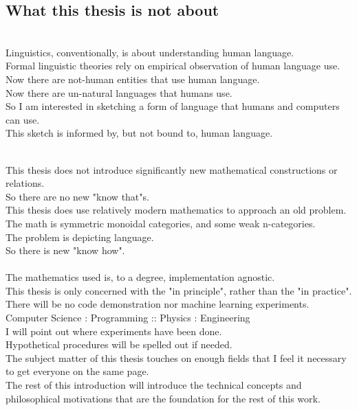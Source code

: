 \begin{fullwidth}
\begin{centering}
\section{What this thesis is not about}

\\
Linguistics, conventionally, is about understanding human language.\\
Formal linguistic theories rely on empirical observation of human language use.\\
Now there are not-human entities that use human language.\\
Now there are un-natural languages that humans use.\\
So I am interested in sketching a form of language that humans and computers can use.\\
This sketch is informed by, but not bound to, human language.

\\
This thesis does not introduce significantly new mathematical constructions or relations.\\
So there are no new "know that"s.\\
This thesis does use relatively modern mathematics to approach an old problem.\\
The math is symmetric monoidal categories, and some weak n-categories.\\
The problem is depicting language.\\
So there is new "know how".\\

\\
The mathematics used is, to a degree, implementation agnostic.\\
This thesis is only concerned with the "in principle", rather than the "in practice".\\
There will be no code demonstration nor machine learning experiments.\\
Computer Science : Programming :: Physics : Engineering\\
I will point out where experiments have been done.\\
Hypothetical procedures will be spelled out if needed.\\

The subject matter of this thesis touches on enough fields that I feel it necessary to get everyone on the same page.\\
The rest of this introduction will introduce the technical concepts and philosophical motivations that are the foundation for the rest of this work.

\end{centering}
\end{fullwidth}